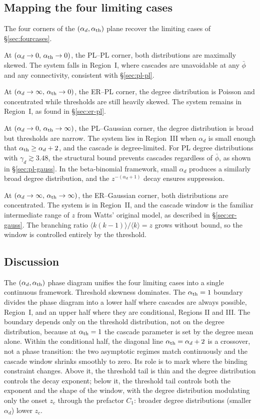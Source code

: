 \documentclass[]{revtex4-2}
\begin{document}
\subsection{Mapping the four limiting cases}

The four corners of the $(\alpha_d,\alpha_{\rm th})$ plane recover the limiting cases of \S\ref{sec:fourcases}.

At $(\alpha_d\to0,\,\alpha_{\rm th}\to0)$, the PL--PL corner, both distributions are maximally skewed. The system falls in Region~I, where cascades are unavoidable at any $\bar\phi$ and any connectivity, consistent with \S\ref{sec:pl-pl}.

At $(\alpha_d\to\infty,\,\alpha_{\rm th}\to0)$, the ER--PL corner, the degree distribution is Poisson and concentrated while thresholds are still heavily skewed. The system remains in Region~I, as found in \S\ref{sec:er-pl}.

At $(\alpha_d\to0,\,\alpha_{\rm th}\to\infty)$, the PL--Gaussian corner, the degree distribution is broad but thresholds are narrow. The system lies in Region~III when $\alpha_d$ is small enough that $\alpha_{\rm th}\ge\alpha_d+2$, and the cascade is degree-limited. For PL degree distributions with $\gamma_d\gtrsim3.48$, the structural bound prevents cascades regardless of $\bar\phi$, as shown in \S\ref{sec:pl-gauss}. In the beta-binomial framework, small $\alpha_d$ produces a similarly broad degree distribution, and the $z^{-(\alpha_d+1)}$ decay ensures suppression.

At $(\alpha_d\to\infty,\,\alpha_{\rm th}\to\infty)$, the ER--Gaussian corner, both distributions are concentrated. The system is in Region~II, and the cascade window is the familiar intermediate range of $z$ from Watts' original model, as described in \S\ref{sec:er-gauss}. The branching ratio $\langle k(k-1)\rangle/\langle k\rangle = z$ grows without bound, so the window is controlled entirely by the threshold.

\subsection{Discussion}

The $(\alpha_d,\alpha_{\rm th})$ phase diagram unifies the four limiting cases into a single continuous framework. Threshold skewness dominates. The $\alpha_{\rm th}=1$ boundary divides the phase diagram into a lower half where cascades are always possible, Region~I, and an upper half where they are conditional, Regions II and III. The boundary depends only on the threshold distribution, not on the degree distribution, because at $\alpha_{\rm th}=1$ the cascade parameter is set by the degree mean alone. Within the conditional half, the diagonal line $\alpha_{\rm th}=\alpha_d+2$ is a crossover, not a phase transition: the two asymptotic regimes match continuously and the cascade window shrinks smoothly to zero. Its role is to mark where the binding constraint changes. Above it, the threshold tail is thin and the degree distribution controls the decay exponent; below it, the threshold tail controls both the exponent and the shape of the window, with the degree distribution modulating only the onset $z_c$ through the prefactor $C_1$: broader degree distributions (smaller $\alpha_d$) lower $z_c$.
\end{document}
